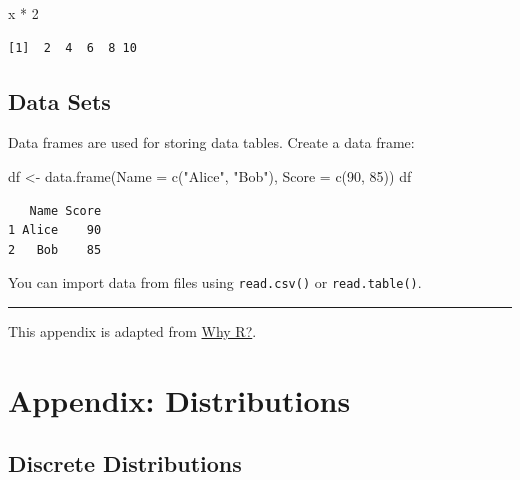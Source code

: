 \documentclass[
  letterpaper,
  DIV=11,
  numbers=noendperiod]{scrreprt}
\newenvironment{Shaded}{\begin{snugshade}}{\end{snugshade}}
\newcommand{\AttributeTok}[1]{\textcolor[rgb]{0.40,0.45,0.13}{#1}}
\newcommand{\DecValTok}[1]{\textcolor[rgb]{0.68,0.00,0.00}{#1}}
\newcommand{\FunctionTok}[1]{\textcolor[rgb]{0.28,0.35,0.67}{#1}}
\newcommand{\NormalTok}[1]{\textcolor[rgb]{0.00,0.23,0.31}{#1}}
\newcommand{\OtherTok}[1]{\textcolor[rgb]{0.00,0.23,0.31}{#1}}
\newcommand{\SpecialCharTok}[1]{\textcolor[rgb]{0.37,0.37,0.37}{#1}}
\newcommand{\StringTok}[1]{\textcolor[rgb]{0.13,0.47,0.30}{#1}}
\begin{document}
\begin{Shaded}
\begin{Highlighting}[]
\NormalTok{x }\SpecialCharTok{*} \DecValTok{2}
\end{Highlighting}
\end{Shaded}

\begin{verbatim}
[1]  2  4  6  8 10
\end{verbatim}

\section{Data Sets}\label{data-sets}

Data frames are used for storing data tables. Create a data frame:

\begin{Shaded}
\begin{Highlighting}[]
\NormalTok{df }\OtherTok{\textless{}{-}} \FunctionTok{data.frame}\NormalTok{(}\AttributeTok{Name =} \FunctionTok{c}\NormalTok{(}\StringTok{"Alice"}\NormalTok{, }\StringTok{"Bob"}\NormalTok{), }\AttributeTok{Score =} \FunctionTok{c}\NormalTok{(}\DecValTok{90}\NormalTok{, }\DecValTok{85}\NormalTok{))}
\NormalTok{df}
\end{Highlighting}
\end{Shaded}

\begin{verbatim}
   Name Score
1 Alice    90
2   Bob    85
\end{verbatim}

You can import data from files using \texttt{read.csv()} or
\texttt{read.table()}.

\begin{center}\rule{0.5\linewidth}{0.5pt}\end{center}

This appendix is adapted from
\href{https://tqtbui.github.io/introbook/app-rintro.html}{Why R?}.

\chapter{Appendix: Distributions}\label{appendix-distributions}

\newcommand{\E}{\mathbb{E}}
\newcommand{\var}{\mathbb{V}ar}

\section{Discrete Distributions}\label{discrete-distributions}
\end{document}
